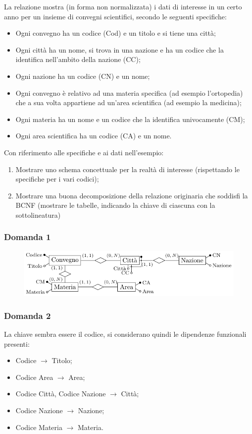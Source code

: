 \documentclass{article}
\begin{document}
La relazione mostra (in forma non normalizzata) i dati di interesse in un certo anno per un insieme di convegni
scientifici, secondo le seguenti specifiche:
\begin{itemize}
    \item Ogni convegno ha un codice (Cod) e un titolo e si tiene una città;
    \item Ogni città ha un nome, si trova in una nazione e ha un codice che la identifica nell'ambito della nazione (CC);
    \item Ogni nazione ha un codice (CN) e un nome;
    \item Ogni convegno è relativo ad una materia specifica (ad esempio l'ortopedia) che a sua volta appartiene
    ad un'area scientifica (ad esempio la medicina); 
    \item Ogni materia ha un nome e un codice che la identifica
    univocamente (CM);
    \item Ogni area scientifica ha un codice (CA) e un nome. 
\end{itemize}
Con riferimento alle specifiche e ai dati nell'esempio:
\begin{enumerate}
    \item Mostrare uno schema concettuale per la realtà di interesse (rispettando le specifiche per i vari codici);
    \item Mostrare una buona decomposizione della relazione originaria che soddisfi la BCNF (mostrare le tabelle, indicando la chiave di ciascuna con la sottolineatura)
\end{enumerate}

\subsubsection*{Domanda 1}

\begin{figure}[H]%
    \centering%
    \includegraphics[scale=1.1]{schema_13-12-24.pdf}%
\end{figure}

\subsubsection*{Domanda 2}
La chiave sembra essere il codice, si considerano quindi le dipendenze funzionali presenti:
\begin{itemize}
    \item Codice $\to$ Titolo;
    \item Codice Area $\to$ Area;
    \item Codice Città, Codice Nazione $\to$ Città;
    \item Codice Nazione $\to$ Nazione;
    \item Codice Materia $\to$ Materia.
\end{itemize}
\end{document}
